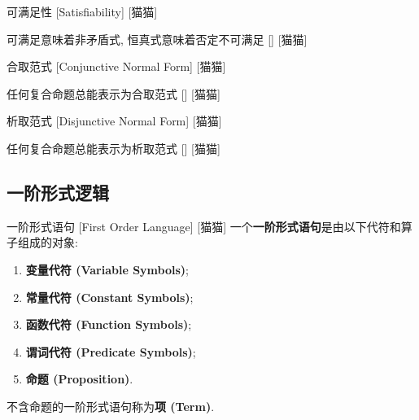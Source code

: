 \documentclass[UTF8]{ctexart}
\begin{document}
            \begin{dfn}
                []
                {可满足性}
                [Satisfiability]
                [猫猫]
            \end{dfn}

            \begin{ppt}
                []
                {可满足意味着非矛盾式, 恒真式意味着否定不可满足}
                []
                [猫猫]
            \end{ppt}

            \begin{dfn}
                []
                {合取范式}
                [Conjunctive Normal Form]
                [猫猫]
            \end{dfn}

            \begin{ppt}
                []
                {任何复合命题总能表示为合取范式}
                []
                [猫猫]
            \end{ppt}

            \begin{dfn}
                []
                {析取范式}
                [Disjunctive Normal Form]
                [猫猫]
            \end{dfn}

            \begin{ppt}
                []
                {任何复合命题总能表示为析取范式}
                []
                [猫猫]
            \end{ppt}
        
        \subsection{一阶形式逻辑}
            
            \begin{dfn}
                []
                {一阶形式语句}
                [First Order Language]
                [猫猫]
                一个\textbf{一阶形式语句}是由以下代符和算子组成的对象: 
                \begin{enumerate}
                    \item \textbf{变量代符 (Variable Symbols)}; 
                    \item \textbf{常量代符 (Constant Symbols)}; 
                    \item \textbf{函数代符 (Function Symbols)}; 
                    \item \textbf{谓词代符 (Predicate Symbols)}; 
                    \item \textbf{命题 (Proposition)}. 
                \end{enumerate}

                不含命题的一阶形式语句称为\textbf{项 (Term)}. 
            \end{dfn}
\end{document}
